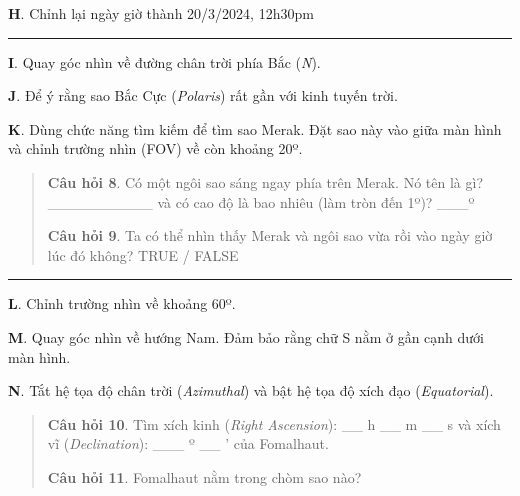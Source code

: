 \documentclass[
  a4paper,
]{book}
\begin{document}
\textbf{H}. Chỉnh lại ngày giờ thành 20/3/2024, 12h30pm

\begin{center}\rule{0.5\linewidth}{0.5pt}\end{center}

\textbf{I}. Quay góc nhìn về đường chân trời phía Bắc (\emph{N}).

\textbf{J}. Để ý rằng sao Bắc Cực (\emph{Polaris}) rất gần với kinh tuyến trời.

\textbf{K}. Dùng chức năng tìm kiếm để tìm sao Merak. Đặt sao này vào giữa màn hình và chỉnh trường nhìn (FOV) về còn khoảng 20º.

\begin{quote}
\textbf{Câu hỏi 8}. Có một ngôi sao sáng ngay phía trên Merak. Nó tên là gì?
\_\_\_\_\_\_\_\_\_\_
và có cao độ là bao nhiêu (làm tròn đến 1º)?
\_\_\_º

\textbf{Câu hỏi 9}. Ta có thể nhìn thấy Merak và ngôi sao vừa rồi vào ngày giờ lúc đó không?
TRUE / FALSE
\end{quote}

\begin{center}\rule{0.5\linewidth}{0.5pt}\end{center}

\textbf{L}. Chỉnh trường nhìn về khoảng 60º.

\textbf{M}. Quay góc nhìn về hướng Nam. Đảm bảo rằng chữ S nằm ở gần cạnh dưới màn hình.

\textbf{N}. Tắt hệ tọa độ chân trời (\emph{Azimuthal}) và bật hệ tọa độ xích đạo (\emph{Equatorial}).

\begin{quote}
\textbf{Câu hỏi 10}. Tìm xích kinh (\emph{Right Ascension}):
\_\_ h
\_\_ m
\_\_ s
và xích vĩ (\emph{Declination}):
\_\_\_ º
\_\_ '
của Fomalhaut.

\textbf{Câu hỏi 11}. Fomalhaut nằm trong chòm sao nào?
\end{quote}
\end{document}
